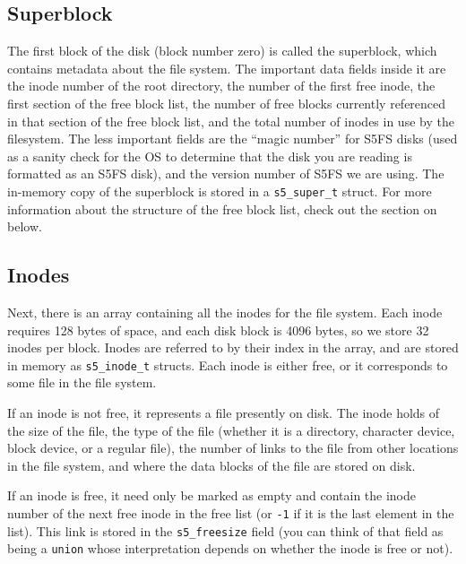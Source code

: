 \subsection{Superblock}

The first block of the disk (block number zero) is called the superblock, which contains metadata about the file system. The important data fields inside it are the inode number of the root directory, the number of the first free inode, the first section of the free block list, the number of free blocks currently referenced in that section of the free block list, and the total number of inodes in use by the filesystem. The less important fields are the ``magic number'' for S5FS disks (used as a sanity check for the OS to determine that the disk you are reading is formatted as an S5FS disk), and the version number of S5FS we are using. The in-memory copy of the superblock is stored in a \texttt{s5\_super\_t} struct. For more information about the structure of the free block list, check out the section on  below.

\subsection{Inodes}

Next, there is an array containing all the inodes for the file system. Each inode requires 128 bytes of space, and each disk block is 4096 bytes, so we store 32 inodes per block. Inodes are referred to by their index in the array, and are stored in memory as \texttt{s5\_inode\_t} structs.  Each inode is either free, or it corresponds to some file in the file system.

If an inode is not free, it represents a file presently on disk.  The inode holds of the size of the file, the type of the file (whether it is a directory, character device, block device, or a regular file), the number of links to the file from other locations in the file system, and where the data blocks of the file are stored on disk.

If an inode is free, it need only be marked as empty and contain the inode number of the next free inode in the free list (or \texttt{-1} if it is the last element in the list). This link is stored in the \texttt{s5\_freesize} field (you can think of that field as being a \texttt{union} whose interpretation depends on whether the inode is free or not).

